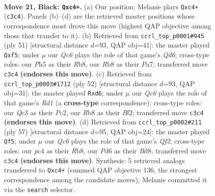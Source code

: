 \documentclass[11pt]{article}
\begin{document}
\clearpage

\begin{figure}[p]\centering
\begin{subfigure}{0.46\textwidth}\centering
\resizebox{\linewidth}{!}{%
\newchessgame
\chessboard[
  setfen={1r3rk1/p2b1pb1/2pp4/7p/P1PNp2P/2q5/5B2/R2Q1K1R b - - 3 21},
  showmover=false,
  pgfstyle=straightmove, color=movearrow, markmove={c3-c4}
]}
\caption{}
\end{subfigure}\hfill
\begin{subfigure}{0.46\textwidth}\centering
\resizebox{\linewidth}{!}{%
\newchessgame
\chessboard[
  setfen={1r3r1k/ppN3bp/8/5Pp1/1P6/3q2Q1/P4PP1/2R2RK1 b - - 0 26},
  showmover=false,
  pgfstyle=straightmove, color=movearrow, markmove={d3-f5}
]}
\caption{}
\end{subfigure}
\\[4pt]
\begin{subfigure}{0.46\textwidth}\centering
\resizebox{\linewidth}{!}{%
\newchessgame
\chessboard[
  setfen={5k1r/1r4p1/3q1b1p/p7/5PP1/1n6/1PP2B1P/1K1R2R1 w - - 0 27},
  showmover=false,
  pgfstyle=straightmove, color=movearrow, markmove={d1-d6}
]}
\caption{}
\end{subfigure}\hfill
\begin{subfigure}{0.46\textwidth}\centering
\resizebox{\linewidth}{!}{%
\newchessgame
\chessboard[
  setfen={br1b1r1k/5qpp/3p4/3Np3/1PB5/R5P1/4QP1P/3R2K1 b - - 8 29},
  showmover=false,
  pgfstyle=straightmove, color=movearrow, markmove={f7-f5}
]}
\caption{}
\end{subfigure}
\caption{\textbf{Move 21, Black: \texttt{Qxc4+}.} (a) Our position; Melanie plays \texttt{Qxc4+} (\texttt{c3c4}). Panels (b)--(d) are the retrieved master positions whose correspondence most drove this move (highest QAP objective among those that transfer to it). (b) Retrieved from \texttt{ccrl\_top\_p0001\#945} (ply 51) [structural distance $d$=93, QAP obj=41]: the master played \texttt{Qxf5}; under $\mu$ our \emph{Qc6} plays the role of that game's \emph{Qd6}; cross-type roles: our \emph{P}h5 as their \emph{R}b8, our \emph{R}b8 as their \emph{P}a7; transferred move \texttt{c3c4} \textbf{(endorses this move)}. (c) Retrieved from \texttt{ccrl\_top\_p0003\#1712} (ply 52) [structural distance $d$=93, QAP obj=31]: the master played \texttt{Rxd6}; under $\mu$ our \emph{Qc6} plays the role of that game's \emph{Rd1} (a \textbf{cross-type} correspondence); cross-type roles: our \emph{Q}c3 as their \emph{P}c2, our \emph{R}b8 as their \emph{B}f2; transferred move \texttt{c3c4} \textbf{(endorses this move)}. (d) Retrieved from \texttt{ccrl\_top\_p0002\#211} (ply 57) [structural distance $d$=95, QAP obj=24]: the master played \texttt{Qf5}; under $\mu$ our \emph{Qc6} plays the role of that game's \emph{Qf2}; cross-type roles: our \emph{p}c4 as their \emph{R}b8, our \emph{P}d6 as their \emph{B}d8; transferred move \texttt{c3c4} \textbf{(endorses this move)}. Synthesis: 5 retrieved analogs transferred to \texttt{Qxc4+} (summed QAP objective 136, the strongest correspondence among the candidate moves); Melanie committed it via the \texttt{search} selector.}
\label{fig:thought-m41}
\end{figure}
\end{document}
